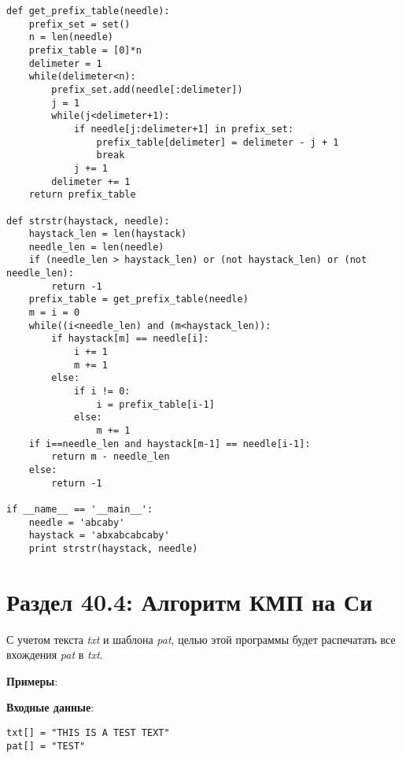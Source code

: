 \begin{tcolorbox}
\begin{verbatim}
def get_prefix_table(needle):   
	prefix_set = set()    
	n = len(needle)   
	prefix_table = [0]*n  
	delimeter = 1
	while(delimeter<n):        
		prefix_set.add(needle[:delimeter])        
		j = 1        
		while(j<delimeter+1):           
			if needle[j:delimeter+1] in prefix_set:
				prefix_table[delimeter] = delimeter - j + 1       
				break            
			j += 1        
		delimeter += 1 
	return prefix_table

def strstr(haystack, needle):    
	haystack_len = len(haystack)    
	needle_len = len(needle)    
	if (needle_len > haystack_len) or (not haystack_len) or (not needle_len):        
		return -1    
	prefix_table = get_prefix_table(needle)    
	m = i = 0    
	while((i<needle_len) and (m<haystack_len)):        
		if haystack[m] == needle[i]:            
			i += 1
			m += 1        
		else:            
			if i != 0:               
				i = prefix_table[i-1]            
			else:                
				m += 1    
	if i==needle_len and haystack[m-1] == needle[i-1]:        
		return m - needle_len    
	else:        
		return -1

if __name__ == '__main__':    
	needle = 'abcaby'    
	haystack = 'abxabcabcaby'    
	print strstr(haystack, needle)
\end{verbatim}
\end{tcolorbox}

\section*{Раздел 40.4: Алгоритм КМП на Си}

С учетом текста \textit{txt} и шаблона \textit{pat}, целью этой программы будет распечатать все вхождения \textit{pat} в \textit{txt}.

\vspace{\baselineskip}

\textbf{Примеры}:

\vspace{\baselineskip}

\textbf{Входные данные}:

\vspace{\baselineskip}

\begin{tcolorbox}
\begin{verbatim}
txt[] = "THIS IS A TEST TEXT"
pat[] = "TEST"
\end{verbatim}
\end{tcolorbox}


